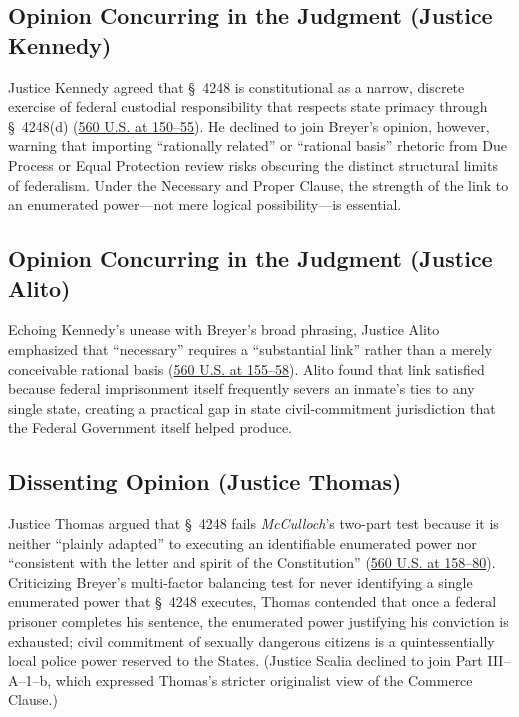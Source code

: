 \documentclass[12pt]{article}
\begin{document}
\subsection{Opinion Concurring in the Judgment (Justice Kennedy)}

Justice Kennedy agreed that \S~4248 is constitutional as a narrow, discrete exercise of federal custodial responsibility that respects state primacy through \S~4248(d) (\href{https://www.law.cornell.edu/supct/html/08-1224.ZC.html}{560 U.S. at 150--55}). He declined to join Breyer's opinion, however, warning that importing ``rationally related'' or ``rational basis'' rhetoric from Due Process or Equal Protection review risks obscuring the distinct structural limits of federalism. Under the Necessary and Proper Clause, the strength of the link to an enumerated power---not mere logical possibility---is essential.

\subsection{Opinion Concurring in the Judgment (Justice Alito)}

Echoing Kennedy's unease with Breyer's broad phrasing, Justice Alito emphasized that ``necessary'' requires a ``substantial link'' rather than a merely conceivable rational basis (\href{https://www.law.cornell.edu/supct/html/08-1224.ZC1.html}{560 U.S. at 155--58}). Alito found that link satisfied because federal imprisonment itself frequently severs an inmate's ties to any single state, creating a practical gap in state civil-commitment jurisdiction that the Federal Government itself helped produce.

\subsection{Dissenting Opinion (Justice Thomas)}

Justice Thomas argued that \S~4248 fails \textit{McCulloch}'s two-part test because it is neither ``plainly adapted'' to executing an identifiable enumerated power nor ``consistent with the letter and spirit of the Constitution'' (\href{https://www.law.cornell.edu/supct/html/08-1224.ZD.html}{560 U.S. at 158--80}). Criticizing Breyer's multi-factor balancing test for never identifying a single enumerated power that \S~4248 executes, Thomas contended that once a federal prisoner completes his sentence, the enumerated power justifying his conviction is exhausted; civil commitment of sexually dangerous citizens is a quintessentially local police power reserved to the States. (Justice Scalia declined to join Part III--A--1--b, which expressed Thomas's stricter originalist view of the Commerce Clause.)
\end{document}

